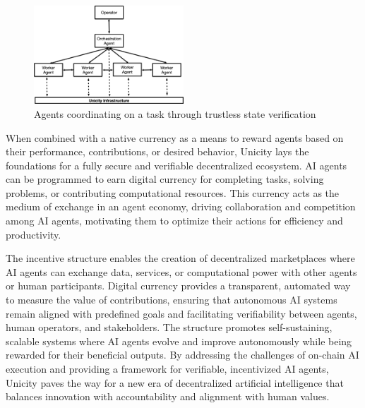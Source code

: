 \documentclass{article}
\begin{document}
\begin{figure}[H]
    \centering
    \includegraphics[width=0.5\textwidth]{AI.png}
    \caption{Agents coordinating on a task through trustless state verification }
    \label{fig:ai}
\end{figure}



When combined with a native currency as a means to reward agents based on their performance, contributions, or desired behavior, Unicity lays the foundations for a fully secure and verifiable decentralized ecosystem. AI agents can be programmed to earn digital currency for completing tasks, solving problems, or contributing computational resources. This currency acts as the medium of exchange in an agent economy, driving collaboration and competition among AI agents, motivating them to optimize their actions for efficiency and productivity.
\vspace{2mm}

The incentive structure  enables the creation of decentralized marketplaces where AI agents can exchange data, services, or computational power with other agents or human participants. Digital currency provides a transparent, automated way to measure the value of contributions, ensuring that autonomous AI systems remain aligned with predefined goals and facilitating verifiability between agents, human operators, and stakeholders. The structure promotes self-sustaining, scalable systems where AI agents evolve and improve autonomously while being rewarded for their beneficial outputs. By addressing the challenges of on-chain AI execution and providing a framework for verifiable, incentivized AI agents, Unicity paves the way for a new era of decentralized artificial intelligence that balances innovation with accountability and alignment with human values.
\end{document}
